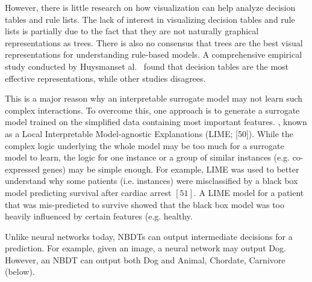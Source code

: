 \hspace*{3.5mm} However, there is little research on how visualization can help analyze decision tables and rule lists. The lack of interest in visualizing decision tables and rule lists is partially due to the fact that they are not naturally graphical representations as trees. There is also no consensus that trees are the best visual representations for understanding rule-based models. A comprehensive empirical study conducted by Huysmanset al.~\cite{mehrabi2019survey} found that decision tables are the most effective representations, while other studies disagrees.


\hspace*{3.5mm}This is a major reason why an interpretable surrogate model may not learn such complex interactions. To overcome this, one approach is to generate a surrogate model trained on the simplified data containing most important features.
, known as a Local Interpretable Model-agnostic Explanations (LIME; [50]). 
While the complex logic underlying the whole model may be too much for a surrogate model to learn, the logic for one instance or a group of similar instances (e.g. co-expressed genes) may be simple enough. For example, LIME was used to better understand why some patients (i.e. instances) were misclassified by a black box model predicting survival after cardiac arrest $[51] .$ A LIME model for a patient that was mis-predicted to survive showed that the black box model was too heavily influenced by certain features (e.g. healthy. 

\hspace*{3.5mm} Unlike neural networks today, NBDTs can output intermediate decisions for a prediction. For example, given an image, a neural network may output Dog. However, an NBDT can output both Dog and Animal, Chordate, Carnivore (below).

